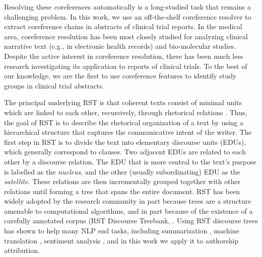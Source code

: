 Resolving these coreferences automatically is a long-studied task that remains a challenging problem.
In this work, we use an off-the-shelf coreference resolver \cite{Clark:2015} to extract coreference chains in abstracts of clinical trial reports. In the medical area, coreference resolution has been most closely studied for analyzing clinical narrative text (e.g.,  in electronic health records) and bio-molecular studies. Despite the active interest in coreference resolution, there has been much less research investigating its application to reports of clinical trials. To the best of our knowledge, we are the first to use coreference features to identify study groups in clinical trial abstracts. 

 The principal underlying RST is that coherent texts consist of minimal units which are linked to each other, recursively, through rhetorical relations \cite{Mann:1988}. Thus, the goal of RST is to describe the rhetorical organization of a text by using a hierarchical structure that captures the communicative intent of the writer. The first step in RST is to divide the text into elementary discourse units (EDUs), which generally correspond to clauses. Two adjacent EDUs are related to each other by a discourse relation. The EDU that is more central to the text's purpose is labelled as the \textit{nucleus}, and the other (usually subordinating) EDU as the \textit{satellite}.
These relations are then incrementally grouped together with other relations until forming a tree that spans the entire document.
RST has been widely adopted by the research community in part because trees are a structure amenable to computational algorithms, and in part because of the existence of a carefully annotated corpus (RST Discourse Treebank, \citep[RST-DT;][]{Carlson:2001}. Using RST discourse trees has shown to help many NLP end tasks, including summarization \cite{Hirao:2013,Durrett:2016}, machine translation \cite{Joty:2017}, sentiment analysis \cite{Ji:2017}, and in this work we apply it to authorship attribution.


